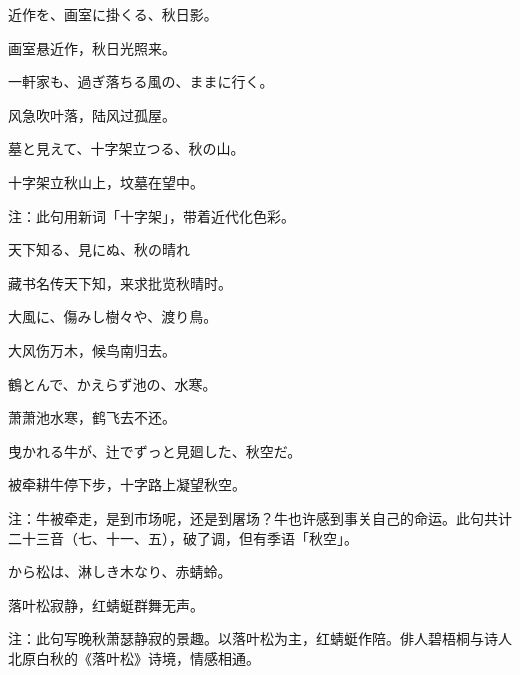 \setcounter{haikucounter}{0}

\begin{haiku}
    {\FH 近作を、画室に掛くる、秋日影。}

    {\FK 画室悬近作，秋日光照来。}
\end{haiku}

\begin{haiku}
    {\FH 一軒家も、過ぎ落ちる風の、ままに行く。}

    {\FK 风急吹叶落，陆风过孤屋。}
\end{haiku}

\begin{haiku}
    {\FH 墓と見えて、十字架立つる、秋の山。}

    {\FK 十字架立秋山上，坟墓在望中。}

    {\FT 注：此句用新词「十字架」，带着近代化色彩。}
\end{haiku}

\begin{haiku}
    {\FH 天下知る、見にぬ、秋の晴れ}

    {\FK 藏书名传天下知，来求批览秋晴时。}
\end{haiku}

\begin{haiku}
    {\FH 大風に、傷みし樹々や、渡り鳥。}

    {\FK 大风伤万木，候鸟南归去。}
\end{haiku}

\begin{haiku}
    {\FH 鶴とんで、かえらず池の、水寒。}

    {\FK 萧萧池水寒，鹤飞去不还。}
\end{haiku}

\begin{haiku}
    {\FH 曳かれる牛が、辻でずっと見廻した、秋空だ。}

    {\FK 被牵耕牛停下步，十字路上凝望秋空。}

    {\FT 注：牛被牵走，是到市场呢，还是到屠场？牛也许感到事关自己的命运。此句共计二十三音（七、十一、五），破了调，但有季语「秋空」。}
\end{haiku}

\begin{haiku}
    {\FH から松は、淋しき木なり、赤蜻蛉。}

    {\FK 落叶松寂静，红蜻蜓群舞无声。}

    {\FT 注：此句写晚秋萧瑟静寂的景趣。以落叶松为主，红蜻蜓作陪。俳人碧梧桐与诗人北原白秋的《落叶松》诗境，情感相通。}
\end{haiku}

